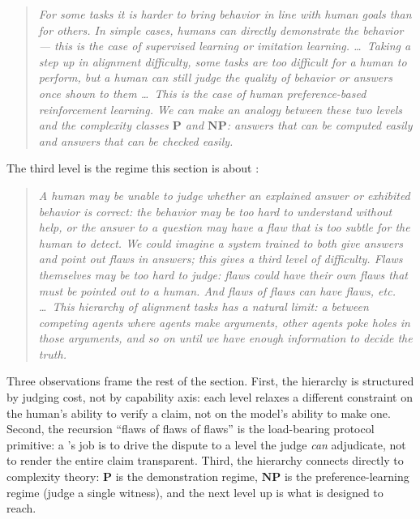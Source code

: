 \begin{quote}\itshape
For some tasks it is harder to bring behavior in line with human goals
than for others. In simple cases, humans can directly demonstrate the
behavior --- this is the case of supervised learning or imitation
learning. \ldots\ Taking a step up in alignment difficulty, some tasks
are too difficult for a human to perform, but a human can still judge
the quality of behavior or answers once shown to them \ldots\ This is
the case of human preference-based reinforcement learning. We can make
an analogy between these two levels and the complexity classes
$\mathbf{P}$ and $\mathbf{NP}$: answers that can be computed easily
and answers that can be checked easily.
\end{quote}

The third level is the regime this section is about
\citep[\S 1]{irving2018-debate}:

\begin{quote}\itshape
A human may be unable to judge whether an explained answer or
exhibited behavior is correct: the behavior may be too hard to
understand without help, or the answer to a question may have a flaw
that is too subtle for the human to detect. We could imagine a system
trained to both give answers and point out flaws in answers; this gives
a third level of difficulty. Flaws themselves may be too hard to judge:
flaws could have their own flaws that must be pointed out to a human.
And flaws of flaws can have flaws, etc. \ldots\ This hierarchy of
alignment tasks has a natural limit: a  between competing agents
where agents make arguments, other agents poke holes in those arguments,
and so on until we have enough information to decide the truth.
\end{quote}

Three observations frame the rest of the section. First, the hierarchy
is structured by judging cost, not by capability axis: each level
relaxes a different constraint on the human's ability to verify a
claim, not on the model's ability to make one. Second, the recursion
``flaws of flaws of flaws'' is the load-bearing protocol primitive: a
's job is to drive the dispute to a level the judge \emph{can}
adjudicate, not to render the entire claim transparent. Third, the
hierarchy connects directly to complexity theory: $\mathbf{P}$ is the
demonstration regime, $\mathbf{NP}$ is the preference-learning regime
(judge a single witness), and the next level up is what  is
designed to reach.

